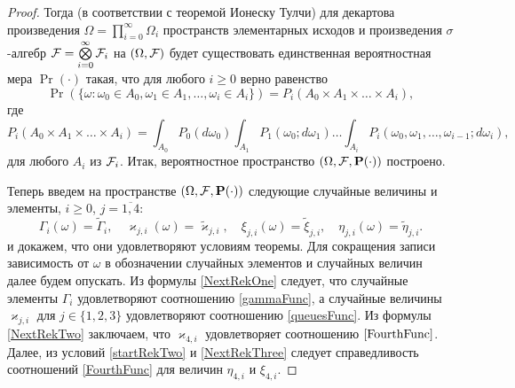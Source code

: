 \documentclass[a4paper,12pt,russian]{extarticle}
\begin{document}
\begin{proof}
Тогда (в соответствии с теоремой Ионеску Тулчи) для декартова произведения $\Omega=\prod\limits_{i=0}^{\infty}\Omega_i$ пространств элементарных исходов и произведения $\sigma$-алгебр ${\cal F}=\bigotimes\limits_{i=0}^{\infty} {\cal F}_i$ на $(\Omega,{\cal F})$ будет существовать единственная вероятностная мера $\Pr(\cdot)$ такая, что для любого $i \geqslant 0$ верно равенство
\begin{equation}
\Pr(\{\omega \colon \omega_0 \in A_0, \omega_1 \in A_1, \ldots, \omega_i\in A_i\})= P_i(A_0 \times A_1 \times \ldots \times A_i),
\label{ProbabilitiesGeneral}
\end{equation}
где 
\begin{equation}
 P_i(A_0 \times A_1 \times \ldots \times A_i) = \int_{A_0} P_0(d \omega_0) \int_{A_1} P_1(\omega_0;d \omega_1) \ldots \int_{A_i} P_i(\omega_0, \omega_1, \ldots, \omega_{i-1}; d \omega_i),
\label{ProbabilitiesGeneralOne}
\end{equation}
для любого $A_i$ из ${\cal F}_i$. Итак, вероятностное пространство $(\Omega,{\cal F},\Pr(\cdot))$ построено. 

Теперь введем на пространстве $(\Omega,{\cal F},\Pr(\cdot))$ следующие случайные величины и элементы, $i \geqslant 0$, $j =\overline{1,4}$:
\begin{equation*}
    \Gamma_i(\omega) = \tilde{\Gamma}_i, \quad \varkappa_{j,i}(\omega) = \tilde{\varkappa}_{j,i},\quad
    \xi_{j,i}(\omega) = \tilde{\xi}_{j,i}, \quad \eta_{j,i}(\omega) = \tilde{\eta}_{j,i}.
\end{equation*}
и докажем, что они  удовлетворяют условиям теоремы. Для сокращения записи зависимость от $\omega$ в обозначении случайных элементов и случайных величин далее будем опускать. Из формулы \eqref{NextRekOne} следует, что случайные элементы $\Gamma_i$ удовлетворяют соотношению \eqref{gammaFunc}, а случайные величины $\varkappa_{j,i}$ для $j\in \{1, 2, 3\}$ удовлетворяют соотношению \eqref{queuesFunc}. Из формулы \eqref{NextRekTwo} заключаем, что $\varkappa_{4,i}$ удовлетворяет соотношению $\eqref{FourthFunc}$. Далее, из условий \eqref{startRekTwo} и \eqref{NextRekThree} следует справедливость соотношений \eqref{FourthFunc} для величин $\eta_{4,i}$ и $\xi_{4,i}$. 


\end{proof}
\end{document}
